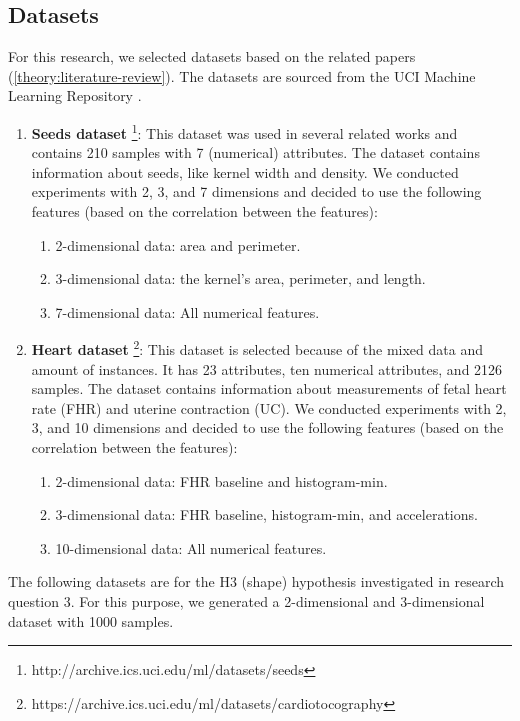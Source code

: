 \subsection{Datasets} \label{datasets-section}
For this research, we selected datasets based on the related papers (\ref{theory:literature-review}).
The datasets are sourced from the UCI Machine Learning Repository \citep{noauthor_uci_nodate}.
\begin{enumerate}
  \item \textbf{Seeds dataset} \footnote{http://archive.ics.uci.edu/ml/datasets/seeds}: This dataset was used in several related works and contains 210 samples with 7 (numerical) attributes.
        The dataset contains information about seeds, like kernel width and density.
        We conducted experiments with 2, 3, and 7 dimensions and decided to use the following features (based on the correlation between the features):
        \begin{enumerate}
          \item 2-dimensional data: area and perimeter.
          \item 3-dimensional data: the kernel's area, perimeter, and length.
          \item 7-dimensional data: All numerical features.
        \end{enumerate}
  \item \textbf{Heart dataset} \footnote{https://archive.ics.uci.edu/ml/datasets/cardiotocography}: This dataset is selected because of the mixed data and amount of instances.
        It has 23 attributes, ten numerical attributes, and 2126 samples.
        The dataset contains information about measurements of fetal heart rate (FHR) and uterine contraction (UC).
        We conducted experiments with 2, 3, and 10 dimensions and decided to use the following features (based on the correlation between the features):
        \begin{enumerate}
          \item 2-dimensional data: FHR baseline and histogram-min.
          \item 3-dimensional data: FHR baseline, histogram-min, and accelerations.
          \item 10-dimensional data: All numerical features.
        \end{enumerate}
\end{enumerate}
The following datasets are for the H3 (shape) hypothesis investigated in research question 3.
For this purpose, we generated a 2-dimensional and 3-dimensional dataset with 1000 samples.
